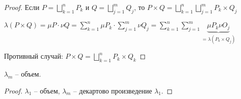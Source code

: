 \begin{proof}
    Если $P = \bigsqcup\limits_{k=1}^n P_k$ и $Q =  \bigsqcup\limits_{j=1}^m Q_j$, то $P\times Q = \bigsqcup\limits_{k=1}^n \bigsqcup\limits_{j=1}^m P_k \times Q_j$

    $\lambda(P \times Q) = \mu P \cdot \nu Q = \sum\limits_{k=1}^n \mu P_k \cdot \sum\limits_{j=1}^m \nu Q_j = \sum\limits_{k=1}^n \sum\limits_{j=1}^m \underbrace{\mu P_k \nu O_j}_{=\lambda (P_k \times Q_j)}$

    Противный случай: $P\times Q = \bigsqcup\limits_{k=1}^n P_k \times Q_k$
\end{proof}

\begin{corollary}
    $\lambda_m$ – объем.
\end{corollary}

\begin{proof}
    $\lambda_1$ – объем, $\lambda_m$ – декартово произведение $\lambda_1$.
\end{proof}
